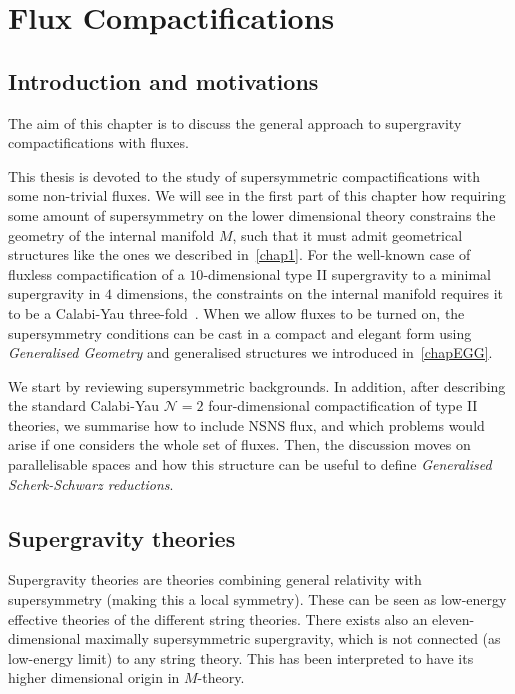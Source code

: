 \documentclass[debug]{phd}
\begin{document}
	\chapter{Flux Compactifications}
	\label{chapComp}
		\section{Introduction and motivations}
			The aim of this chapter is to discuss the general approach to supergravity compactifications with fluxes.
						
			This thesis is devoted to the study of supersymmetric compactifications with some non-trivial fluxes.
			We will see in the first part of this chapter how requiring some amount of supersymmetry on the lower dimensional theory constrains the geometry of the internal manifold $M$, such that it must admit geometrical structures like the ones we described in~\cref{chap1}.
			For the well-known case of fluxless compactification of a $10$-dimensional type II supergravity to a minimal supergravity in $4$ dimensions, the constraints on the internal manifold requires it to be a Calabi-Yau three-fold~\cite{CYcomp}.
			When we allow fluxes to be turned on, the supersymmetry conditions can be cast in a compact and elegant form using \emph{Generalised Geometry} and generalised structures we introduced in~\cref{chapEGG}.
			
			We start by reviewing supersymmetric backgrounds.
			In addition, after describing the standard Calabi-Yau $\mathcal{N}=2$ four-dimensional compactification of type II theories, we summarise how to include NSNS flux, and which problems would arise if one considers the whole set of fluxes.
			Then, the discussion moves on parallelisable spaces and how this structure can be useful to define \emph{Generalised Scherk-Schwarz reductions}.
		\section{Supergravity theories}
			Supergravity theories are theories combining general relativity with supersymmetry (making this a local symmetry).
			These can be seen as low-energy effective theories of the different string theories.
			There exists also an eleven-dimensional maximally supersymmetric supergravity, which is not connected (as low-energy limit) to any string theory.
			This has been interpreted to have its higher dimensional origin in $M$-theory.
			
\end{document}
